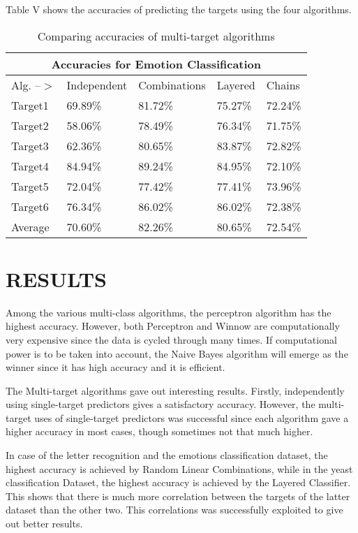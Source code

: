 \documentclass[letterpaper, 11 pt, conference]{IEEEtran}  %
\begin{document}
Table V shows the accuracies of predicting the targets using the four algorithms.

\begin{table}[h]
	\caption{Comparing accuracies of multi-target algorithms}
	\centering
\begin{tabular}{ |p{1.2cm}|p{1.5cm}|p{1.7cm}|p{1cm}|p{1.25cm}|}
		\hline
		\multicolumn{5}{|c|}{Accuracies for Emotion Classification} \\
		\hline
		Alg. --$>$& Independent& Combinations  & Layered  & Chains \\
		\hline
		Target1 & 69.89\% & 81.72\% & 75.27\% & 72.24\% \\
		Target2 & 58.06\% & 78.49\% & 76.34\% & 71.75\% \\
		Target3 & 62.36\% & 80.65\% & 83.87\% & 72.82\% \\
		Target4 & 84.94\% & 89.24\% & 84.95\% & 72.10\% \\
		Target5 & 72.04\% & 77.42\% & 77.41\% & 73.96\% \\
		Target6 & 76.34\% & 86.02\% & 86.02\% & 72.38\% \\
		\hline
		Average & 70.60\% & 82.26\% & 80.65\% & 72.54\% \\
		\hline
	\end{tabular}
\end{table}


\section{RESULTS}

Among the various multi-class algorithms, the perceptron algorithm has the highest accuracy. However, both Perceptron and Winnow are computationally very expensive since the data is cycled through many times. If computational power is to be taken into account, the Naive Bayes algorithm will emerge as the winner since it has high accuracy and it is efficient.

The Multi-target algorithms gave out interesting results. Firstly, independently using single-target predictors gives a satisfactory accuracy. However, the multi-target uses of single-target predictors was successful since each algorithm gave a higher accuracy in most cases, though sometimes not that much higher.

In case of the letter recognition and the emotions classification dataset, the highest accuracy is achieved by Random Linear Combinations, while in the yeast classification Dataset, the highest accuracy is achieved by the Layered Classifier. This shows that there is much more correlation between the targets of the latter dataset than the other two. This correlations was successfully exploited to give out better results.
\end{document}
